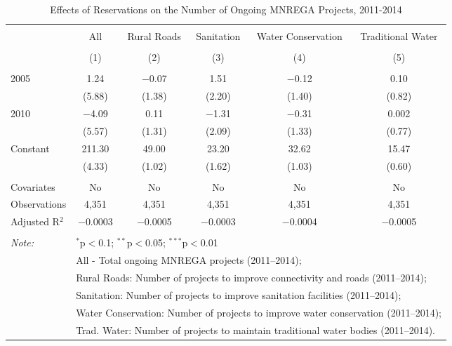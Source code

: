 
\begin{table}[!htbp] \centering 
  \caption{Effects of Reservations on the Number of Ongoing MNREGA Projects, 2011-2014} 
  \label{main_mnrega_ongoing} 
\scriptsize 
\begin{tabular}{@{\extracolsep{1pt}}lccccc} 
\\[-1.8ex]\hline 
\hline \\[-1.8ex] 
 & All & Rural Roads & Sanitation & Water Conservation & Traditional Water \\ 
\\[-1.8ex] & (1) & (2) & (3) & (4) & (5)\\ 
\hline \\[-1.8ex] 
 2005 & 1.24 & $-$0.07 & 1.51 & $-$0.12 & 0.10 \\ 
  & (5.88) & (1.38) & (2.20) & (1.40) & (0.82) \\ 
  2010 & $-$4.09 & 0.11 & $-$1.31 & $-$0.31 & 0.002 \\ 
  & (5.57) & (1.31) & (2.09) & (1.33) & (0.77) \\ 
  Constant & 211.30 & 49.00 & 23.20 & 32.62 & 15.47 \\ 
  & (4.33) & (1.02) & (1.62) & (1.03) & (0.60) \\ 
 \hline \\[-1.8ex] 
Covariates & No & No & No & No & No \\ 
Observations & 4,351 & 4,351 & 4,351 & 4,351 & 4,351 \\ 
Adjusted R$^{2}$ & $-$0.0003 & $-$0.0005 & $-$0.0003 & $-$0.0004 & $-$0.0005 \\ 
\hline 
\hline \\[-1.8ex] 
\textit{Note:}  & \multicolumn{5}{l}{$^{*}$p$<$0.1; $^{**}$p$<$0.05; $^{***}$p$<$0.01} \\ 
 & \multicolumn{5}{l}{All - Total ongoing MNREGA projects (2011--2014);} \\ 
 & \multicolumn{5}{l}{Rural Roads: Number of projects to improve connectivity and roads (2011--2014);} \\ 
 & \multicolumn{5}{l}{Sanitation:  Number of projects to improve sanitation facilities  (2011--2014);} \\ 
 & \multicolumn{5}{l}{Water Conservation: Number of projects to improve water conservation (2011--2014);} \\ 
 & \multicolumn{5}{l}{Trad. Water: Number of projects to maintain traditional water bodies (2011--2014).} \\ 
\end{tabular} 
\end{table} 
